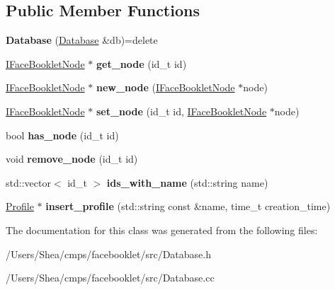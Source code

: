 \subsection*{Public Member Functions}
\begin{DoxyCompactItemize}
\item 
\hypertarget{classfb_1_1_database_a05f8a138a9fe74f160be8f0f5e53568a}{{\bfseries Database} (\hyperlink{classfb_1_1_database}{Database} \&db)=delete}\label{classfb_1_1_database_a05f8a138a9fe74f160be8f0f5e53568a}

\item 
\hypertarget{classfb_1_1_database_a37037408e2ece4145b6d5487b3fff140}{\hyperlink{structfb_1_1_i_face_booklet_node}{I\+Face\+Booklet\+Node} $\ast$ {\bfseries get\+\_\+node} (id\+\_\+t id)}\label{classfb_1_1_database_a37037408e2ece4145b6d5487b3fff140}

\item 
\hypertarget{classfb_1_1_database_a6c7d28b50a83abc53dea5957231cba36}{\hyperlink{structfb_1_1_i_face_booklet_node}{I\+Face\+Booklet\+Node} $\ast$ {\bfseries new\+\_\+node} (\hyperlink{structfb_1_1_i_face_booklet_node}{I\+Face\+Booklet\+Node} $\ast$node)}\label{classfb_1_1_database_a6c7d28b50a83abc53dea5957231cba36}

\item 
\hypertarget{classfb_1_1_database_a33759a955ab671e0fe014d478250cdc2}{\hyperlink{structfb_1_1_i_face_booklet_node}{I\+Face\+Booklet\+Node} $\ast$ {\bfseries set\+\_\+node} (id\+\_\+t id, \hyperlink{structfb_1_1_i_face_booklet_node}{I\+Face\+Booklet\+Node} $\ast$node)}\label{classfb_1_1_database_a33759a955ab671e0fe014d478250cdc2}

\item 
\hypertarget{classfb_1_1_database_a92c3028d238865d57c94881431465e76}{bool {\bfseries has\+\_\+node} (id\+\_\+t id)}\label{classfb_1_1_database_a92c3028d238865d57c94881431465e76}

\item 
\hypertarget{classfb_1_1_database_ab2ccc687a520e876da67f6620b75308c}{void {\bfseries remove\+\_\+node} (id\+\_\+t id)}\label{classfb_1_1_database_ab2ccc687a520e876da67f6620b75308c}

\item 
\hypertarget{classfb_1_1_database_a94dc36e64c814292188de74e6da46024}{std\+::vector$<$ id\+\_\+t $>$ {\bfseries ids\+\_\+with\+\_\+name} (std\+::string name)}\label{classfb_1_1_database_a94dc36e64c814292188de74e6da46024}

\item 
\hypertarget{classfb_1_1_database_a3de24f423df58c48719ee508c3285f5a}{\hyperlink{classfb_1_1_profile}{Profile} $\ast$ {\bfseries insert\+\_\+profile} (std\+::string const \&name, time\+\_\+t creation\+\_\+time)}\label{classfb_1_1_database_a3de24f423df58c48719ee508c3285f5a}

\end{DoxyCompactItemize}


The documentation for this class was generated from the following files\+:\begin{DoxyCompactItemize}
\item 
/\+Users/\+Shea/cmps/facebooklet/src/Database.\+h\item 
/\+Users/\+Shea/cmps/facebooklet/src/Database.\+cc\end{DoxyCompactItemize}

